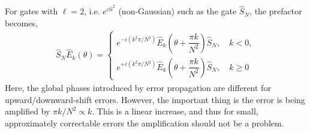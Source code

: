 \documentclass{article}
\begin{document}
For gates with $\ell=2$, i.e. $e^{c\hat{n}^2}$ (non-Gaussian) such as the gate $\hat{S}_N$, the prefactor becomes,
\begin{align}
    \hat{S}_N \hat{E}_k(\theta) = \begin{cases}
        e^{-i(k^2\pi/N^2)}\hat{E}_k\left(\theta+\dfrac{\pi k}{N^2}\right)\hat{S}_N,\quad k < 0,\\[10pt]
        e^{+i(k^2\pi/N^2)}\hat{E}_k\left(\theta+\dfrac{\pi k}{N^2}\right)\hat{S}_N,\quad k \geq 0
    \end{cases}
\end{align}
Here, the global phases introduced by error propagation are different for upward/downward-shift errors. However, the important thing is the error is being amplified by $\pi k/N^2\propto k$. This is a linear increase, and thus for small, approximately correctable errors the amplification should not be a problem.  
\end{document}
